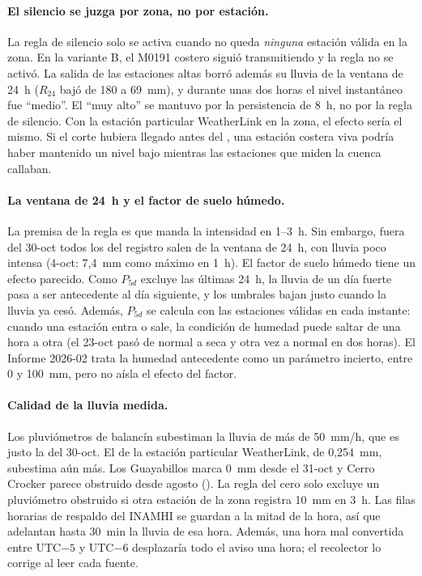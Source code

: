 \documentclass{sosg-informe}
\begin{document}
\paragraph{El silencio se juzga por zona, no por estación.} La regla de silencio solo se activa cuando no queda \emph{ninguna} estación válida en la zona. En la variante B, el M0191 costero siguió transmitiendo y la regla no se activó. La salida de las estaciones altas borró además su lluvia de la ventana de 24~h ($R_{24}$ bajó de 180 a 69~mm), y durante unas dos horas el nivel instantáneo fue \enquote{medio}. El \enquote{muy alto} se mantuvo por la persistencia de 8~h, no por la regla de silencio. Con la estación particular WeatherLink en la zona, el efecto sería el mismo. Si el corte hubiera llegado antes del \alto{}, una estación costera viva podría haber mantenido un nivel bajo mientras las estaciones que miden la cuenca callaban.

\paragraph{La ventana de 24~h y el factor de suelo húmedo.} La premisa de la regla es que manda la intensidad en 1--3~h. Sin embargo, fuera del 30-oct todos los \alto{} del registro salen de la ventana de 24~h, con lluvia poco intensa (4-oct: 7,4~mm como máximo en 1~h). El factor de suelo húmedo tiene un efecto parecido. Como $P_{5d}$ excluye las últimas 24~h, la lluvia de un día fuerte pasa a ser antecedente al día siguiente, y los umbrales bajan justo cuando la lluvia ya cesó. Además, $P_{5d}$ se calcula con las estaciones válidas en cada instante: cuando una estación entra o sale, la condición de humedad puede saltar de una hora a otra (el 23-oct pasó de normal a seca y otra vez a normal en dos horas). El Informe 2026-02 trata la humedad antecedente como un parámetro incierto, entre 0 y 100~mm, pero no aísla el efecto del factor.

\paragraph{Calidad de la lluvia medida.} Los pluviómetros de balancín subestiman la lluvia de más de 50~mm/h, que es justo la del 30-oct. El de la estación particular WeatherLink, de 0,254~mm, subestima aún más. Los Guayabillos marca 0~mm desde el 31-oct y Cerro Crocker parece obstruido desde agosto (). La regla del cero solo excluye un pluviómetro obstruido si otra estación de la zona registra 10~mm en 3~h. Las filas horarias de respaldo del INAMHI se guardan a la mitad de la hora, así que adelantan hasta 30~min la lluvia de esa hora. Además, una hora mal convertida entre UTC$-5$ y UTC$-6$ desplazaría todo el aviso una hora; el recolector lo corrige al leer cada fuente.
\end{document}
